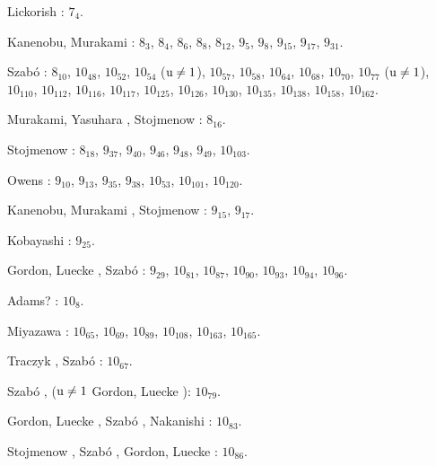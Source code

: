 \begin{compactitem}
\item Lickorish \cite{lickorish85}: $7_{4}$.
%
\item Kanenobu, Murakami \cite{kanenobumurakami86}: $8_{3}$, $8_{4}$, $8_{6}$, $8_{8}$, $8_{12}$, $9_{5}$, $9_{8}$, $9_{15}$, $9_{17}$, $9_{31}$.
%
%
\item Szabó \cite{szabo05}: $8_{10}$, $10_{48}$, $10_{52}$, $10_{54}$ ($\operatorname{u} \neq 1$), $10_{57}$, $10_{58}$, $10_{64}$, $10_{68}$, $10_{70}$, $10_{77}$ ($\operatorname{u} \neq 1$), $10_{110}$, $10_{112}$, $10_{116}$, $10_{117}$, $10_{125}$, $10_{126}$, $10_{130}$, $10_{135}$, $10_{138}$, $10_{158}$, $10_{162}$.
%
\item Murakami, Yasuhara \cite{yasuhara00}, Stojmenow \cite{stoimenow04}: $8_{16}$.
%
%
\item Stojmenow \cite{stoimenow04}: $8_{18}$, $9_{37}$, $9_{40}$, $9_{46}$, $9_{48}$, $9_{49}$, $10_{103}$.
\item Owens \cite{owens08}: $9_{10}$, $9_{13}$, $9_{35}$, $9_{38}$, $10_{53}$, $10_{101}$, $10_{120}$.
%
\item Kanenobu, Murakami \cite{kanenobumurakami86}, Stojmenow \cite{stoimenow04}: $9_{15}$, $9_{17}$.
\item Kobayashi \cite{kobayashi89}: $9_{25}$.
%
\item Gordon, Luecke \cite{gordon06}, Szabó \cite{szabo05}: $9_{29}$, $10_{81}$, $10_{87}$, $10_{90}$, $10_{93}$, $10_{94}$, $10_{96}$.
%
%
\item Adams? \cite[s. 62]{adams94}: $10_{8}$.
%
\item Miyazawa \cite{miyazawa98}: $10_{65}$, $10_{69}$, $10_{89}$, $10_{108}$, $10_{163}$, $10_{165}$.
%
\item Traczyk \cite{traczyk99}, Szabó \cite{szabo05}: $10_{67}$.
%
\item Szabó \cite{szabo05}, ($\operatorname{u} \neq 1$ Gordon, Luecke \cite{gordon06}): $10_{79}$.
\item Gordon, Luecke \cite{gordon06}, Szabó \cite{szabo05}, Nakanishi \cite{nakanishi05}: $10_{83}$.
%
\item Stojmenow \cite{stoimenow04}, Szabó \cite{szabo05}, Gordon, Luecke \cite{gordon06}: $10_{86}$.

\end{compactitem}
